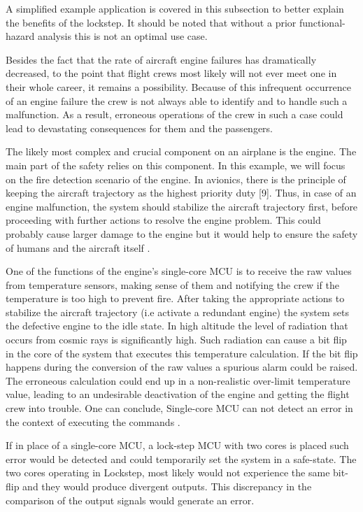 A simplified example application is covered in this subsection to better explain the benefits of the lockstep. It should be noted that without a prior functional-hazard analysis this is not an optimal use case.

Besides the fact that the rate of aircraft engine failures has dramatically decreased,
to the point that flight crews most likely will not ever meet one in their
whole career, it remains a possibility. Because of this infrequent occurrence
of an engine failure the crew is not always able to identify and to handle such a
malfunction. As a result, erroneous operations of the crew in such a case could
lead to devastating consequences for them and the passengers.

The likely most complex and crucial component on an airplane is the engine. The main part of the safety relies on this component. In this example, we will focus on the fire detection scenario of the engine. 
In avionics, there is the principle of keeping the aircraft trajectory as
the highest priority duty [9]. Thus, in case of an engine malfunction, the system
should stabilize the aircraft trajectory first, before proceeding with further actions
to resolve the engine problem. This could probably cause larger damage to the
engine but it would help to ensure the safety of humans and the aircraft itself  \citep{lockstep_analysis}.

One of the functions of the engine's single-core MCU is to receive the raw values from temperature sensors, making sense of them and notifying the crew if the temperature is too high to prevent fire.  
After taking the appropriate actions to stabilize the aircraft trajectory (i.e activate a redundant engine) the system sets the defective engine to the idle state. In high
altitude the level of radiation that occurs from cosmic rays is significantly high.
Such radiation can cause a bit flip in the core of the
system that executes this temperature calculation. If the bit flip happens during the conversion of the raw values a spurious alarm could be raised. The erroneous calculation could end up in a non-realistic
over-limit temperature value, leading to an undesirable deactivation of the engine
and getting the flight crew into trouble. One can conclude, Single-core MCU can not detect an error in the context of executing the commands  \citep{lockstep_analysis}.

If in place of a single-core MCU, a lock-step MCU with two cores is placed such error would be detected and could temporarily set the system in a safe-state. The
two cores operating in Lockstep, most likely would not experience the same bit-flip
and they would produce divergent outputs. This discrepancy in the comparison of
the output signals would generate an error.


